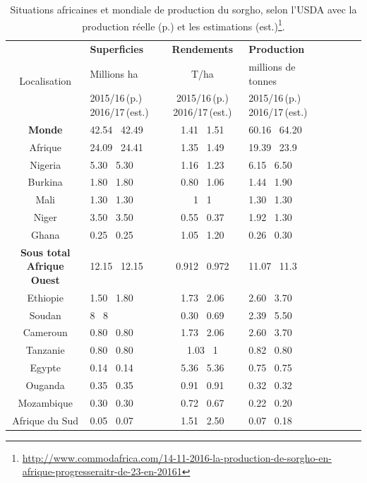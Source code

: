 \documentclass[a4paper,11pt]{article}
\begin{document}
\begin{table}
  \begin{center}
    \begin{tabular}{|c|p{4.5cm}|c|p{4.5cm}|c|p{4.5cm}|c|p{4.5cm}|}
      \hline
      \multirow{3}{*}{Localisation} & \textbf{Superficies}      & \textbf{Rendements}  & \textbf{Production}          \\ \cline{2-3}
      & Millions ha                & T/ha                 & millions de tonnes          \\ \cline{2-3}
      & 2015/16\,(p.) 2016/17\,(est.) & 2015/16\,(p.)  2016/17\,(est.) & 2015/16\,(p.) 2016/17\,(est.)        \\ \hline
      \multirow{1}{*}{\textbf{Monde}} & 42.54  \, 42.49 & 1.41  \, 1.51 & 60.16 \, 64.20 \\ \hline
      \multirow{1}{*}{Afrique} & 24.09 \, 24.41 & 1.35 \, 1.49 & 19.39 \, 23.9 \\ \hline
      \multirow{1}{*}{Nigeria} & 5.30  \, 5.30 & 1.16  \, 1.23 & 6.15 \, 6.50 \\ \hline
      \multirow{1}{*}{Burkina} & 1.80  \, 1.80 & 0.80  \, 1.06 & 1.44 \, 1.90 \\ \hline
      \multirow{1}{*}{Mali} & 1.30  \, 1.30 & 1  \, 1  & 1.30  \, 1.30  \\ \hline
      \multirow{1}{*}{Niger} & 3.50  \, 3.50 & 0.55  \, 0.37  & 1.92  \, 1.30  \\ \hline
      \multirow{1}{*}{Ghana} & 0.25  \, 0.25 & 1.05  \, 1.20  & 0.26  \, 0.30  \\ \hline
      \multirow{1}{*}{\textbf{Sous total Afrique Ouest}} & 12.15  \, 12.15 & 0.912 \, 0.972  & 11.07  \, 11.3  \\ \hline
      \multirow{1}{*}{Ethiopie} & 1.50  \, 1.80 & 1.73  \, 2.06  & 2.60  \, 3.70  \\ \hline
      \multirow{1}{*}{Soudan} & 8  \, 8 & 0.30  \, 0.69  & 2.39  \, 5.50  \\ \hline
      \multirow{1}{*}{Cameroun} & 0.80  \, 0.80 & 1.73  \, 2.06  & 2.60  \, 3.70  \\ \hline
      \multirow{1}{*}{Tanzanie} & 0.80  \, 0.80 & 1.03  \, 1  & 0.82  \, 0.80  \\ \hline
      \multirow{1}{*}{Egypte} & 0.14  \, 0.14 & 5.36  \, 5.36  & 0.75  \, 0.75  \\ \hline
      \multirow{1}{*}{Ouganda} & 0.35  \, 0.35 & 0.91  \, 0.91  & 0.32  \, 0.32  \\ \hline
      \multirow{1}{*}{Mozambique} & 0.30  \, 0.30 & 0.72  \, 0.67  & 0.22  \, 0.20  \\ \hline
      \multirow{1}{*}{Afrique du Sud} & 0.05  \, 0.07 & 1.51  \, 2.50  & 0.07  \, 0.18  \\ \hline
    \end{tabular}
    \caption{Situations africaines et mondiale de production du
      sorgho, selon l'USDA avec la production réelle (p.) et les
      estimations (est.)\protect\footnote{\protect\url{http://www.commodafrica.com/14-11-2016-la-production-de-sorgho-en-afrique-progresseraitr-de-23-en-20161}}.}
  \end{center}
\end{table}
\end{document}

